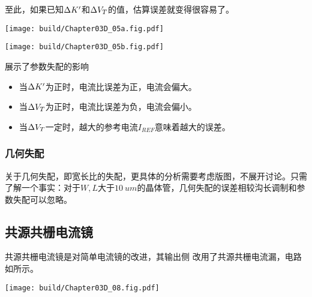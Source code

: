 至此，如果已知$\Delta{K'}$和$\Delta{V_T}$的值，估算误差就变得很容易了。

\begin{Figure}[参数失配对电流镜的影响]
    \begin{FigureSub}[跨导增益失配]
        \texttt{[image: build/Chapter03D\_05a.fig.pdf]}
    \end{FigureSub}
    \begin{FigureSub}[阈值电压失配]
        \texttt{[image: build/Chapter03D\_05b.fig.pdf]}
    \end{FigureSub}
\end{Figure}

展示了参数失配的影响
\begin{itemize}
    \item 当$\Delta{K}'$为正时，电流比误差为正，电流会偏大。
    \item 当$\Delta{V_T}$为正时，电流比误差为负，电流会偏小。
    \item 当$\Delta{V_T}$一定时，越大的参考电流$I_{REF}$意味着越大的误差。
\end{itemize}

\subsubsection{几何失配}
关于几何失配，即宽长比的失配，更具体的分析需要考虑版图，不展开讨论。只需了解一个事实：对于$W,L$大于$\SI{10}{um}$的晶体管，几何失配的误差相较沟长调制和参数失配可以忽略。

\subsection{共源共栅电流镜}
共源共栅电流镜是对简单电流镜的改进，其输出侧 改用了共源共栅电流漏，电路如所示。\goodbreak

\begin{Figure}[共源共栅电流镜]
    \texttt{[image: build/Chapter03D\_08.fig.pdf]}
\end{Figure}

